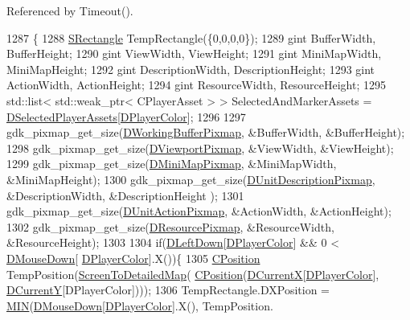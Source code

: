 Referenced by Timeout().


\begin{DoxyCode}
1287                                      \{
1288     \hyperlink{structSRectangle}{SRectangle} TempRectangle(\{0,0,0,0\});
1289     gint BufferWidth, BufferHeight;
1290     gint ViewWidth, ViewHeight;
1291     gint MiniMapWidth, MiniMapHeight;
1292     gint DescriptionWidth, DescriptionHeight;
1293     gint ActionWidth, ActionHeight;
1294     gint ResourceWidth, ResourceHeight;
1295     std::list< std::weak\_ptr< CPlayerAsset > > SelectedAndMarkerAssets = 
      \hyperlink{classCApplicationData_a05c1087d5a5c4ddc14fcb37444f1642b}{DSelectedPlayerAssets}[\hyperlink{classCApplicationData_a53550939b20cba70570f113e4d1c5d02}{DPlayerColor}];
1296 
1297     gdk\_pixmap\_get\_size(\hyperlink{classCApplicationData_afa34cf2780f38dd28c0c811e69d60a97}{DWorkingBufferPixmap}, &BufferWidth, &BufferHeight); 
1298     gdk\_pixmap\_get\_size(\hyperlink{classCApplicationData_ac8801e116d0c49776c9f3db7415287fe}{DViewportPixmap}, &ViewWidth, &ViewHeight); 
1299     gdk\_pixmap\_get\_size(\hyperlink{classCApplicationData_abe3af81659ead5113b7b2f165a88e737}{DMiniMapPixmap}, &MiniMapWidth, &MiniMapHeight); 
1300     gdk\_pixmap\_get\_size(\hyperlink{classCApplicationData_a52e5c1a2ac452c82580ba3f4978c3501}{DUnitDescriptionPixmap}, &DescriptionWidth, &DescriptionHeight
      ); 
1301     gdk\_pixmap\_get\_size(\hyperlink{classCApplicationData_ae264356c833cd581093e3b373cce6620}{DUnitActionPixmap}, &ActionWidth, &ActionHeight); 
1302     gdk\_pixmap\_get\_size(\hyperlink{classCApplicationData_aa9faf270fb2d769855fa5d787a883a83}{DResourcePixmap}, &ResourceWidth, &ResourceHeight); 
1303     
1304     \textcolor{keywordflow}{if}(\hyperlink{classCApplicationData_a2b943f18557c3e4c8cd4550e22e028b6}{DLeftDown}[\hyperlink{classCApplicationData_a53550939b20cba70570f113e4d1c5d02}{DPlayerColor}] && 0 < \hyperlink{classCApplicationData_ad7a43a29e7906e44f09347850796a915}{DMouseDown}[
      \hyperlink{classCApplicationData_a53550939b20cba70570f113e4d1c5d02}{DPlayerColor}].X())\{
1305         \hyperlink{classCPosition}{CPosition} TempPosition(\hyperlink{classCApplicationData_a5c8b0ebf35fddb89b22f035544c32222}{ScreenToDetailedMap}(
      \hyperlink{classCPosition}{CPosition}(\hyperlink{classCApplicationData_a1dc7ee482a39f7978c71365ac540f97a}{DCurrentX}[\hyperlink{classCApplicationData_a53550939b20cba70570f113e4d1c5d02}{DPlayerColor}], \hyperlink{classCApplicationData_a0ba39779ae11c8072258c6ddfebd6052}{DCurrentY}[DPlayerColor])));
1306         TempRectangle.DXPosition = \hyperlink{main_8cpp_a3acffbd305ee72dcd4593c0d8af64a4f}{MIN}(\hyperlink{classCApplicationData_ad7a43a29e7906e44f09347850796a915}{DMouseDown}[\hyperlink{classCApplicationData_a53550939b20cba70570f113e4d1c5d02}{DPlayerColor}].X(), TempPosition.

\end{DoxyCode}
